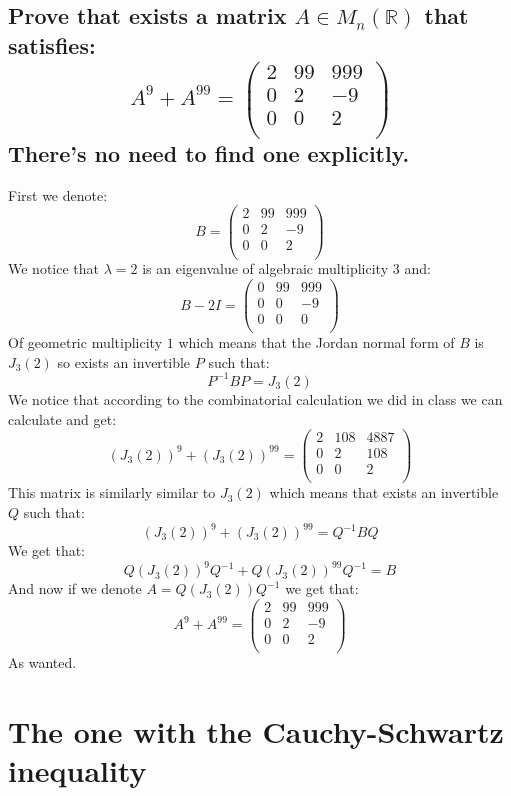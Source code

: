 \documentclass[11pt,a4paper]{article}
\theoremstyle{plain}
\newcommand{\R}{\mathbb{R}}
\begin{document}
	\subsection{Prove that exists a matrix $A\in M_n(\R)$ that satisfies:
	\[
		A^9+A^{99} = \begin{pmatrix}
		2 & 99 & 999\\
		0 & 2 & -9\\
		0 & 0 & 2\\
	\end{pmatrix}
	\] There's no need to find one explicitly.}
	First we denote:
	\[
		B = \begin{pmatrix}
		2 & 99 & 999\\
		0 & 2 & -9\\
		0 & 0 & 2\\
		\end{pmatrix}
	\]
	We notice that $\lambda = 2$ is an eigenvalue of algebraic multiplicity $3$
	and:
	\[
		B - 2I = \begin{pmatrix}
		0 & 99 & 999\\
		0 & 0 & -9\\
		0 & 0 & 0\\
		\end{pmatrix}
	\]
	Of geometric multiplicity $1$ which means that the Jordan normal form of $B$
	is $J_3(2)$ so exists an invertible $P$ such that:
	\[
		P^{-1}BP = J_3(2)
	\]
	We notice that according to the combinatorial calculation we did in class we
	can calculate and get:
	\[
	(J_3(2))^9 + (J_3(2))^{99} = \begin{pmatrix}
		2 & 108 & 4887\\
		0 & 2 & 108\\
		0 & 0 & 2\\
	\end{pmatrix}
	\]
	This matrix is similarly similar to $J_3(2)$ which means that exists an invertible
	$Q$ such that:
	\[
		(J_3(2))^9 + (J_3(2))^{99} = Q^{-1}BQ
	\]
	We get that:
	\[
		Q (J_3(2))^9 Q^{-1} + Q (J_3(2))^{99} Q^{-1} = B
	\]
	And now if we denote $A = Q (J_3(2)) Q^{-1}$ we get that:
	\[
		A^9+A^{99} = \begin{pmatrix}
		2 & 99 & 999\\
		0 & 2 & -9\\
		0 & 0 & 2\\
		\end{pmatrix}
	\]
	As wanted.

	\newpage
	\section{The one with the Cauchy-Schwartz inequality}
	
\end{document}
